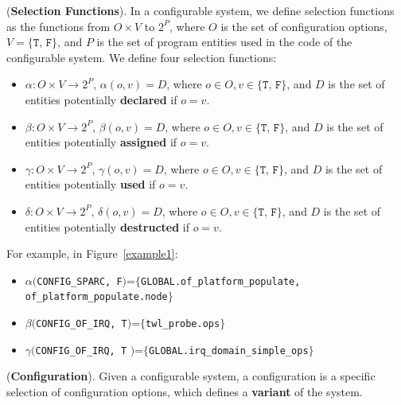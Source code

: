 
\begin{Definition}{({\bf Selection Functions}).}
In a configurable system, we define selection functions as the
functions from $O\times V$ to $2^P$, where $O$ is the set of
configuration options, $V=\{\texttt{T, F}\}$, and $P$ is the set of program
entities used in the code of the configurable system. We define four selection functions:

\begin{itemize}

\item $\alpha: O \times V \to 2^P$, $\alpha(o, v) = D$, where $o \in O, v \in \{\texttt{T, F}\}$, and $D$ is the set of entities potentially {\bf declared} if $o = v$.

\item $\beta: O \times V \to 2^P$, $\beta(o, v) = D$, where $o \in O, v \in \{\texttt{T, F}\}$, and $D$ is the set of entities potentially {\bf assigned} if $o = v$.

\item $\gamma: O \times V \to 2^P$, $\gamma(o, v) = D$, where $o \in O, v \in \{\texttt{T, F}\}$, and $D$ is the set of entities potentially {\bf used} if $o = v$.

\item $\delta: O \times V \to 2^P$, $\delta(o, v) = D$, where $o \in O, v \in \{\texttt{T, F}\}$, and $D$ is the set of entities potentially {\bf destructed} if $o = v$.
\end{itemize}

\end{Definition}

For example, in Figure~\ref{example1}:

\begin{itemize}

\item $\alpha($\texttt{CONFIG\_SPARC, F}$)$=$\{$\texttt{GLOBAL.of\_platform\_populate, of\_platform\_populate.node}$\}$

\item $\beta($\texttt{CONFIG\_OF\_IRQ, T}$)$=$\{$\texttt{twl\_probe.ops}$\}$

\item $\gamma($\texttt{CONFIG\_OF\_IRQ, T} $)$=$\{$\texttt{GLOBAL.irq\_domain\_simple\_ops}$\}$

\end{itemize}

\begin{Definition}{({\bf Configuration}).}
Given a configurable system, a configuration is a specific
selection of configuration options, which defines a \textbf{variant}
of the system.
\end{Definition}

